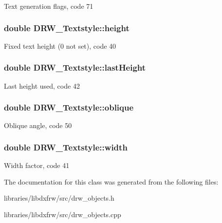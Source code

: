 Text generation flags, code 71 \hypertarget{classDRW__Textstyle_a23809c13d923ae1ae43dc83c2f200e47}{
\subsubsection[{height}]{\setlength{\rightskip}{0pt plus 5cm}double D\-R\-W\-\_\-\-Textstyle\-::height}}\label{classDRW__Textstyle_a23809c13d923ae1ae43dc83c2f200e47}
Fixed text height (0 not set), code 40 \hypertarget{classDRW__Textstyle_ad7c6c347da9dfa658fabeeb46e430da4}{
\subsubsection[{last\-Height}]{\setlength{\rightskip}{0pt plus 5cm}double D\-R\-W\-\_\-\-Textstyle\-::last\-Height}}\label{classDRW__Textstyle_ad7c6c347da9dfa658fabeeb46e430da4}
Last height used, code 42 \hypertarget{classDRW__Textstyle_a5d133a89292ecc76b6a66af88039c6cc}{
\subsubsection[{oblique}]{\setlength{\rightskip}{0pt plus 5cm}double D\-R\-W\-\_\-\-Textstyle\-::oblique}}\label{classDRW__Textstyle_a5d133a89292ecc76b6a66af88039c6cc}
Oblique angle, code 50 \hypertarget{classDRW__Textstyle_a36bce344a959c198199e88482ede075a}{
\subsubsection[{width}]{\setlength{\rightskip}{0pt plus 5cm}double D\-R\-W\-\_\-\-Textstyle\-::width}}\label{classDRW__Textstyle_a36bce344a959c198199e88482ede075a}
Width factor, code 41 

The documentation for this class was generated from the following files\-:\begin{DoxyCompactItemize}
\item 
libraries/libdxfrw/src/drw\-\_\-objects.\-h\item 
libraries/libdxfrw/src/drw\-\_\-objects.\-cpp\end{DoxyCompactItemize}
